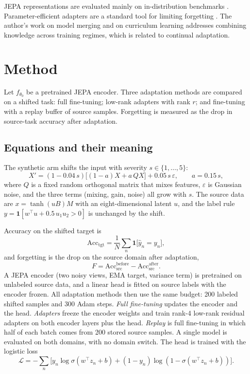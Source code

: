\documentclass[conference]{IEEEtran}
\begin{document}
JEPA representations are evaluated mainly on in-distribution benchmarks \cite{bardes2024vjepa}. Parameter-efficient adapters are a standard tool for limiting forgetting \cite{d10peft}. The author's work on model merging \cite{d4merging} and on curriculum learning \cite{d3curriculum} addresses combining knowledge across training regimes, which is related to continual adaptation.

\section{Method}
Let $f_{\theta_0}$ be a pretrained JEPA encoder. Three adaptation methods are compared on a shifted task: full fine-tuning; low-rank adapters with rank $r$; and fine-tuning with a replay buffer of source samples. Forgetting is measured as the drop in source-task accuracy after adaptation.

\subsection*{Equations and their meaning}
The synthetic arm shifts the input with severity $s\in\{1,\dots,5\}$:
\begin{equation}
X'=(1-0.04\,s)\big[(1-a)X+a\,QX\big]+0.05\,s\,\varepsilon,\qquad a=0.15\,s,
\end{equation}
where $Q$ is a fixed random orthogonal matrix that mixes features, $\varepsilon$ is Gaussian noise, and the three terms (mixing, gain, noise) all grow with $s$. The source data are $x=\tanh(uB)M$ with an eight-dimensional latent $u$, and the label rule $y=\mathbf{1}[w^\top u+0.5\,u_1u_2>0]$ is unchanged by the shift.

Accuracy on the shifted target is
\begin{equation}
\mathrm{Acc}_{\mathrm{tgt}}=\frac{1}{N}\sum_{n}\mathbf{1}\big[\hat y_n=y_n\big],
\end{equation}
and forgetting is the drop on the source domain after adaptation,
\begin{equation}
F=\mathrm{Acc}_{\mathrm{src}}^{\mathrm{before}}-\mathrm{Acc}_{\mathrm{src}}^{\mathrm{after}}.
\end{equation}
A JEPA encoder (two noisy views, EMA target, variance term) is pretrained on unlabeled source data, and a linear head is fitted on source labels with the encoder frozen. All adaptation methods then use the same budget: 200 labeled shifted samples and 300 Adam steps. \emph{Full fine-tuning} updates the encoder and the head. \emph{Adapters} freeze the encoder weights and train rank-4 low-rank residual adapters on both encoder layers plus the head. \emph{Replay} is full fine-tuning in which half of each batch comes from 200 stored source samples. A single model is evaluated on both domains, with no domain switch. The head is trained with the logistic loss
\begin{equation}
\mathcal{L}=-\sum_{n}\big[y_n\log\sigma(w^\top z_n+b)+(1-y_n)\log(1-\sigma(w^\top z_n+b))\big].
\end{equation}
\end{document}
